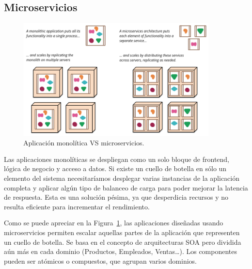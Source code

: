 \subsection{Microservicios}\label{sec:micro}
\begin{figure}
\centering
\includegraphics[width=0.9\textwidth]{sketch.png}
\caption{\label{fig:msv}Aplicación monolítica VS microservicios.}
\end{figure}

Las aplicaciones monolíticas se despliegan como un solo bloque de frontend, lógica de negocio y acceso a datos. Si existe un cuello de botella en sólo un elemento del sistema necesitaríamos desplegar varias instancias de la aplicación completa y aplicar algún tipo de balanceo de carga para poder mejorar la latencia de respuesta. Esta es una solución pésima, ya que desperdicia recursos y no resulta eficiente para incrementar el rendimiento.

Como se puede apreciar en la Figura~\ref{fig:msv}, las aplicaciones diseñadas usando microservicios permiten escalar aquellas partes de la aplicación que representen un cuello de botella. Se basa en el concepto de arquitecturas SOA pero dividida aún más en cada dominio (Productos, Empleados, Ventas…). Los componentes pueden ser atómicos o compuestos, que agrupan varios dominios.

